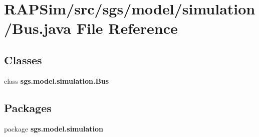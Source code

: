 \section{R\-A\-P\-Sim/src/sgs/model/simulation/\-Bus.java File Reference}
\label{_bus_8java}
\subsection*{Classes}
\begin{DoxyCompactItemize}
\item 
class {\bf sgs.\-model.\-simulation.\-Bus}
\end{DoxyCompactItemize}
\subsection*{Packages}
\begin{DoxyCompactItemize}
\item 
package {\bf sgs.\-model.\-simulation}
\end{DoxyCompactItemize}
